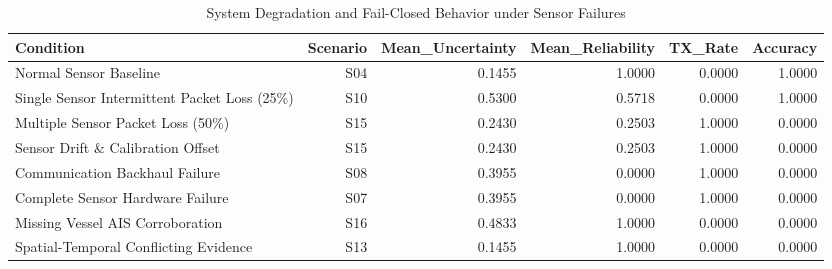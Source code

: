 \begin{table}[htbp]
\centering
\caption{System Degradation and Fail-Closed Behavior under Sensor Failures}
\begin{tabular}{lrrrrr}
\toprule
Condition & Scenario & Mean\_Uncertainty & Mean\_Reliability & TX\_Rate & Accuracy \\
\midrule
Normal Sensor Baseline & S04 & 0.1455 & 1.0000 & 0.0000 & 1.0000 \\
Single Sensor Intermittent Packet Loss (25\%) & S10 & 0.5300 & 0.5718 & 0.0000 & 1.0000 \\
Multiple Sensor Packet Loss (50\%) & S15 & 0.2430 & 0.2503 & 1.0000 & 0.0000 \\
Sensor Drift \& Calibration Offset & S15 & 0.2430 & 0.2503 & 1.0000 & 0.0000 \\
Communication Backhaul Failure & S08 & 0.3955 & 0.0000 & 1.0000 & 0.0000 \\
Complete Sensor Hardware Failure & S07 & 0.3955 & 0.0000 & 1.0000 & 0.0000 \\
Missing Vessel AIS Corroboration & S16 & 0.4833 & 1.0000 & 0.0000 & 0.0000 \\
Spatial-Temporal Conflicting Evidence & S13 & 0.1455 & 1.0000 & 0.0000 & 0.0000 \\
\bottomrule
\end{tabular}
\end{table}
